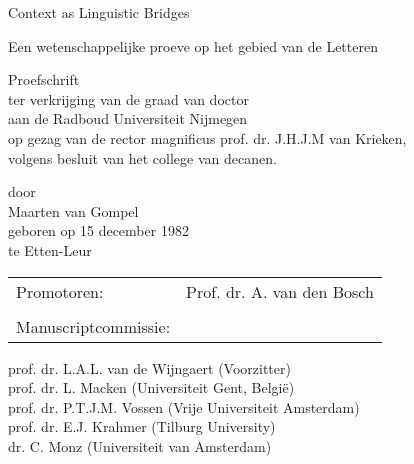 \documentclass[11pt,makeidx,english]{style/phdthesis}
\author{Maarten van Gompel}
\theoremstyle{break}
\begin{document}
\frontmatter

\pagestyle{plain}



\begin{titlepage}
\begin{center}
\vspace{8cm}
{\Huge Context as Linguistic Bridges}


\vspace{1cm}
Een wetenschappelijke proeve op het gebied van de Letteren

\vspace{6cm}
{\LARGE Proefschrift }\\
\vspace{1cm}
ter verkrijging van de graad van doctor\\
aan de Radboud Universiteit Nijmegen\\
op gezag van de rector magnificus prof. dr. J.H.J.M van Krieken,\\
volgens besluit van het college van decanen.\\

\vspace{2cm}

door\\
\vspace{1cm}
{\LARGE Maarten van Gompel}\\
\vspace{0.5cm}
geboren op 15 december 1982\\
te Etten-Leur


\vspace{0.5cm}


\end{center}

\clearpage

\thispagestyle{empty}
\begin{tabular}{ll}
Promotoren: & Prof. dr. A. van den Bosch \\
 & \\
Manuscriptcommissie: & \\
\end{tabular}
prof. dr. L.A.L. van de Wijngaert (Voorzitter)  \\
prof. dr. L. Macken (Universiteit Gent, België) \\
prof. dr. P.T.J.M. Vossen (Vrije Universiteit Amsterdam) \\
prof. dr. E.J. Krahmer  (Tilburg University) \\
dr. C. Monz  (Universiteit van Amsterdam) \\
\end{titlepage}
\end{document}
